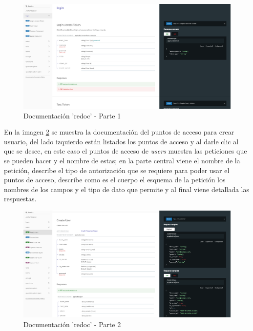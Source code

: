 \begin{figure}[!htb]
    \centering
    \includegraphics[scale=.25]{TT/img/implementacion/redoc_1.png}
    \caption{Documentación 'redoc' - Parte 1}
    \label{graphic:redoc1}
\end{figure}

En la imagen \ref{graphic:redoc2} se muestra la documentación del puntos de acceso para crear usuario, del lado izquierdo están listados los puntos de acceso y al darle clic al que se desee, en este caso el puntos de acceso de \textit{users} muestra las peticiones que se pueden hacer y el nombre de estas; en la parte central viene el nombre de la petición, describe el tipo de autorización que se requiere para poder usar el puntos de acceso, describe como es el cuerpo el esquema de la petición los nombres de los campos y el tipo de dato que permite y al final viene detallada las respuestas.
\begin{figure}[!htb]
    \centering
    \includegraphics[scale=.25]{TT/img/implementacion/redoc_2.png}
    \caption{Documentación 'redoc' - Parte 2}
    \label{graphic:redoc2}
\end{figure}

